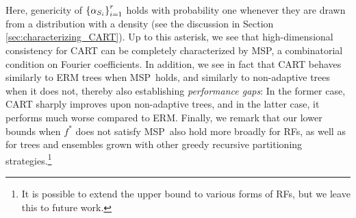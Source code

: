 \documentclass[11pt]{article}
\newtheorem{proposition}[theorem]{Proposition}
\DeclarePairedDelimiter{\braces}{\lbrace}{\rbrace}
\DeclarePairedDelimiter{\paren}{(}{)}
\newcommand{\E}{\mathbb{E}}
\renewcommand{\xspace}{\mathcal{X}}
\newcommand{\binspace}{\braces{\pm 1}^\nfeats}
\newcommand{\xmeasure}{\nu}
\newcommand{\sparsity}{s}
\newcommand{\nfeats}{d}
\newcommand{\nsamples}{n}
\newcommand{\data}[1][n]{\mathcal{D}_{#1}}
\newcommand{\MSP}{\textsf{MSP}}
\newcommand{\ferm}{\hat{f}_{\operatorname{ERM}}}
\newcommand{\fna}{\hat{f}_{\operatorname{NA}}}
\newcommand{\comment}[2]{{#2}}
\begin{document}
Here, genericity of $\braces*{\alpha_{S_i}}_{i=1}^r$ holds with probability one whenever they are drawn from a distribution with a density \comment{red}{(see the discussion in Section \ref{sec:characterizing_CART}).}
Up to this asterisk, we see that high-dimensional consistency for CART can be completely characterized by \textsf{MSP}, a combinatorial condition on Fourier coefficients.
In addition, we see in fact that CART behaves similarly to ERM trees when \MSP~holds, and similarly to non-adaptive trees when it does not, thereby also establishing \emph{performance gaps}:
In the former case, CART sharply improves upon non-adaptive trees, and in the latter case, it performs much worse compared to ERM.
Finally, we remark that our lower bounds when $f^*$ does not satisfy \MSP~also hold more broadly for RFs, as well as for trees and ensembles grown with other greedy recursive partitioning strategies.\footnote{It is possible to extend the upper bound to various forms of RFs, but we leave this to future work.}

\end{document}
